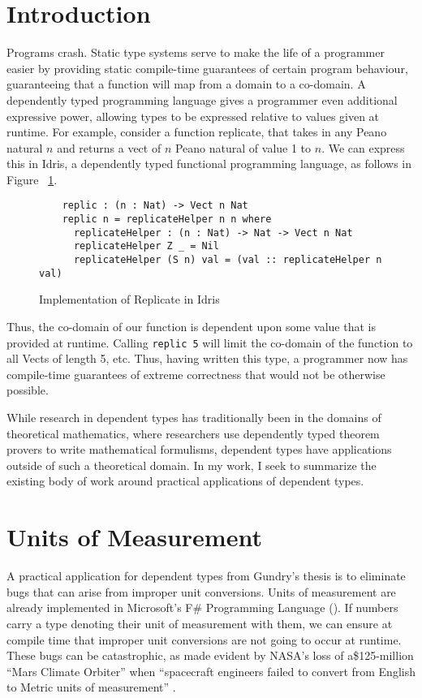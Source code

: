 \section{Introduction}
Programs crash. Static type systems serve to make the life of a programmer
easier by providing static compile-time guarantees of certain program behaviour,
guaranteeing that a function will map from a domain to a co-domain. A
dependently typed programming language gives a programmer even additional
expressive power, allowing types to be expressed relative to values given at
runtime. For example, consider a function replicate, that takes in any Peano
natural $n$ and returns a vect of $n$ Peano natural of value 1 to $n$. We can
express this in Idris, a dependently typed functional programming language, as
follows in Figure ~\ref{replicate_in_idris}. 

\begin{figure}
  \caption{Implementation of Replicate in Idris}
  \label{replicate_in_idris}
  \begin{lstlisting}
    replic : (n : Nat) -> Vect n Nat
    replic n = replicateHelper n n where
      replicateHelper : (n : Nat) -> Nat -> Vect n Nat
      replicateHelper Z _ = Nil
      replicateHelper (S n) val = (val :: replicateHelper n val)
  \end{lstlisting}
\end{figure}

Thus, the co-domain of our function is dependent upon some value that is
provided at runtime. Calling \texttt{replic 5} will limit the co-domain of the
function to all Vects of length 5, etc. Thus, having written this type, a
programmer now has compile-time guarantees of extreme correctness that would not
be otherwise possible. 

While research in dependent types has traditionally been in the domains of
theoretical mathematics, where researchers use dependently typed theorem provers
to write mathematical formulisms, dependent types have applications outside of
such a theoretical domain. In my work, I seek to summarize the existing body of
work around practical applications of dependent types. 

\section{Units of Measurement}
A practical application for dependent types from Gundry's thesis is to eliminate
bugs that can arise from improper unit conversions. Units of measurement are
already implemented in Microsoft's F\# Programming Language
(\cite{kennedy2009}). If numbers carry a type denoting their unit of measurement
with them, we can ensure at compile time that improper unit conversions are not
going to occur at runtime. These bugs can be catastrophic, as made evident by
NASA's loss of a\$125-million ``Mars Climate Orbiter'' when ``spacecraft
engineers failed to convert from English to Metric units of measurement''
\cite{hotz1999}. 

